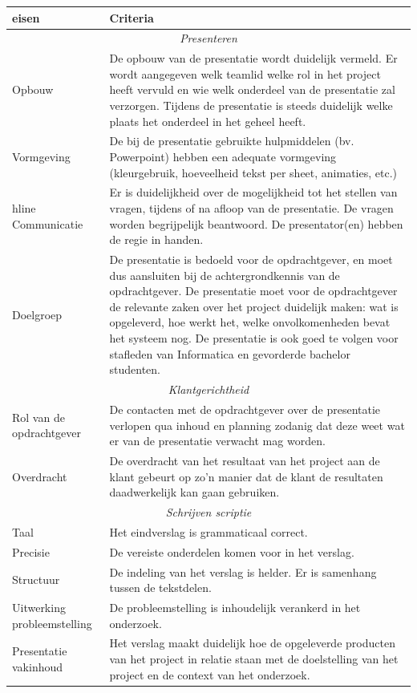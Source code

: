 {\small\sf
\begin{center}
    \begin{tabular}{|p{7em}|p{23em}|}
	\hline
	{\bf eisen} & {\bf Criteria}\\\hline
	\multicolumn{2}{|c|}{\emph{Presenteren}}\\\hline
	Opbouw & De opbouw van de presentatie wordt duidelijk vermeld.
		Er wordt aangegeven welk teamlid welke rol in het project heeft vervuld en wie
		welk onderdeel van de presentatie zal verzorgen.
		Tijdens de presentatie is steeds duidelijk welke plaats het onderdeel in het
		geheel heeft.
	\\\hline
	Vormgeving & De bij de presentatie gebruikte hulpmiddelen (bv. Powerpoint) hebben een
		adequate vormgeving (kleurgebruik, hoeveelheid tekst per sheet, animaties, etc.)
	\\hline
	Communicatie & Er is duidelijkheid over de mogelijkheid tot het stellen van
		vragen, tijdens of na afloop van de presentatie. De vragen worden begrijpelijk beantwoord.
		De presentator(en) hebben de regie in handen.
	\\\hline
	Doelgroep & De presentatie is bedoeld voor de opdrachtgever, en moet dus aansluiten bij de
		achtergrondkennis van de opdrachtgever.
		De presentatie moet voor de opdrachtgever de relevante zaken over het  project
		duidelijk maken: wat is opgeleverd, hoe werkt het, welke onvolkomenheden bevat
		het systeem nog.
		De presentatie is ook goed te volgen voor stafleden van Informatica en
		gevorderde bachelor studenten.
	\\\hline
	\multicolumn{2}{|c|}{\emph{Klantgerichtheid}}\\\hline
	Rol van de opdrachtgever & De contacten met de opdrachtgever over de presentatie verlopen qua inhoud en
		planning zodanig dat deze weet wat er van de presentatie verwacht mag worden.
	\\\hline
	Overdracht & De overdracht van het resultaat van het project aan de klant gebeurt op zo’n
		manier dat de klant de resultaten daadwerkelijk kan gaan gebruiken.
	\\\hline
	\multicolumn{2}{|c|}{\emph{Schrijven scriptie}}\\\hline
	Taal & Het eindverslag is grammaticaal correct.
	\\\hline
	Precisie & De vereiste onderdelen komen voor in het verslag.
	\\\hline
	Structuur & De indeling van het verslag is helder.
		Er is samenhang tussen de tekstdelen.
	\\\hline
	Uitwerking probleemstelling & De probleemstelling is inhoudelijk
		verankerd in het onderzoek.
	\\\hline
	Presentatie vakinhoud & Het verslag maakt duidelijk hoe de opgeleverde producten van het project in
		relatie staan met de doelstelling van het project en de context van het onderzoek.
	\\\hline
    \end{tabular}
\end{center}
}%
